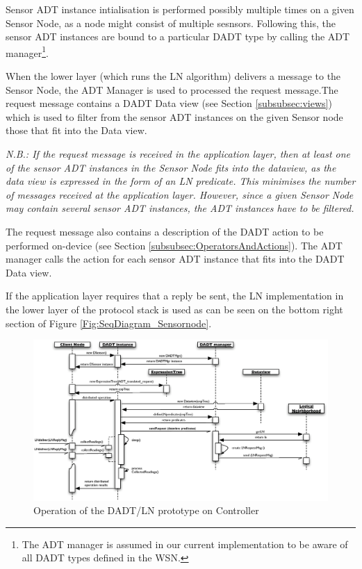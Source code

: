 Sensor ADT instance intialisation is performed possibly
multiple times
on a given Sensor Node, as a node might consist of multiple sesnsors. Following
this, the sensor ADT instances are bound to a particular DADT type by calling
the ADT manager\footnote{The ADT manager is assumed in our
current implementation to be aware of all DADT types defined in the WSN.}.

When the lower layer (which runs the LN algorithm) delivers a message to the
Sensor Node, the ADT Manager is used to processed the request message.The
request message contains a DADT Data view (see Section \ref{subsubsec:views})
which is used to filter from the sensor ADT instances on the given Sensor node
those that fit into the Data view. %

\emph{N.B.: If the request message is received in the application layer, then at least
one of the sensor ADT instances in the Sensor Node fits into the dataview, as
the data view is expressed in the form of an LN predicate. This minimises the
number of messages received at the application layer. However, since a given
Sensor Node may contain several sensor ADT instances, the ADT instances have to
be filtered.}

The request message also contains a description of the DADT action to be
performed on-device (see Section
\ref{subsubsec:OperatorsAndActions}). The ADT manager calls the action for each
sensor ADT instance that fits into the DADT Data view. 

If the application layer requires that a reply be sent, the LN implementation in
the lower layer of the protocol stack is used as can be seen on the bottom right
section of Figure \ref{Fig:SeqDiagram_Sensornode}.

\begin{figure}
\centering
\label{Fig:SeqDiagram_PCnode}
\includegraphics[width=\textwidth]{img/SeqDiagram_PCnode.eps}
\caption[Operation of the DADT/LN prototype on Controller]{Operation of the DADT/LN prototype on Controller}
\end{figure}


